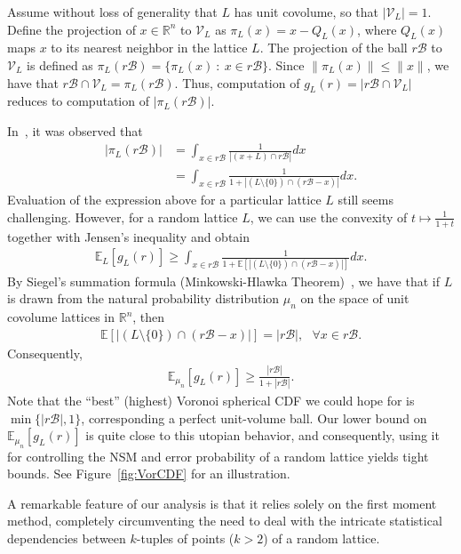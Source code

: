 \documentclass[article,doublecolumn]{IEEEtran}
\newcommand{\EE}{{\mathbb{E}}}
\newcommand{\R}{{\mathbb{R}}}
\newcommand{\mVL}{{\mathcal{V}_L}}
\newcommand{\mBeuc}{{\mathcal{B}}}
\newcommand{\VcdfL}{g_L}
\begin{document}
Assume without loss of generality that $L$ has unit covolume, so that $|\mVL|=1$. Define the projection of $x\in\R^n$ to $\mVL$ as $\pi_L(x)=x-Q_L(x)$, where $Q_L(x)$ maps $x$ to its nearest neighbor in the lattice $L$. The projection of the ball $r\mBeuc$ to $\mVL$ is defined as $\pi_L(r\mBeuc)=\{\pi_L(x)~:~x\in r\mBeuc\}$. Since $\|\pi_L(x)\|\leq \|x\|$, we have that $r\mBeuc\cap \mVL=\pi_L(r\mBeuc)$. Thus, computation of $\VcdfL(r)=\left|r\mBeuc\cap \mVL \right|$ reduces to computation of $|\pi_L(r\mBeuc)|$.

In~\cite[Proof of Proposition 3.6]{ORW23}, it was observed that
\begin{align*}
|\pi_L(r\mBeuc)|&=\int_{x\in r\mBeuc}\frac{1}{|(x+L)\cap r\mBeuc|}dx\\
&=\int_{x\in r\mBeuc}\frac{1}{1+|(L\setminus\{0\})\cap (r\mBeuc-x)|}dx.
\end{align*}    
Evaluation of the expression above for a particular lattice $L$ still seems challenging. However, for a random lattice $L$, we can use the convexity of $t\mapsto\frac{1}{1+t}$ together with Jensen's inequality and obtain
\begin{align*}
\EE_L[\VcdfL(r)]\geq \int_{x\in r\mBeuc}\frac{1}{1+\EE\left[|(L\setminus\{0\})\cap (r\mBeuc-x)|\right]}dx.    
\end{align*}
By Siegel's summation formula (Minkowski-Hlawka Theorem)~\cite{SiegelFormula}, we have that if $L$ is drawn from the natural probability distribution $\mu_n$ on the space of unit covolume lattices in $\R^n$, then
\begin{align*}
\EE\left[|(L\setminus\{0\})\cap (r\mBeuc-x)|\right]=|r\mBeuc|,~~~\forall x\in r\mBeuc.
\end{align*}
Consequently,
\begin{align*}
\EE_{\mu_n}[\VcdfL(r)]\geq\frac{|r\mBeuc|}{1+|r\mBeuc|}.    
\end{align*}
Note that the ``best'' (highest) Voronoi spherical CDF we could hope for is $\min\{|r\mBeuc|,1\}$, corresponding a perfect unit-volume ball. Our lower bound on $\EE_{\mu_n}[\VcdfL(r)]$ is quite close to this utopian behavior, and consequently, using it for controlling the NSM and error probability of a random lattice yields tight bounds. See Figure~\ref{fig:VorCDF} for an illustration.

A remarkable feature of our analysis is that it relies solely on the first moment method, completely circumventing the need to deal with the intricate statistical dependencies between $k$-tuples of points ($k>2$) of a random lattice.
\end{document}
